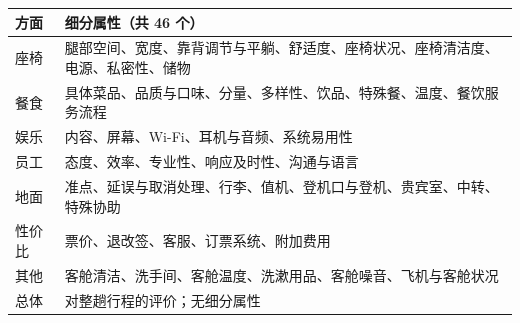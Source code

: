 \documentclass[10pt,twocolumn,a4paper]{article}
\begin{document}
\begin{center}\small
\begin{tabularx}{\textwidth}{@{}P{30mm}Y@{}}
\toprule
\textbf{方面} & \textbf{细分属性（共 46 个）} \\
\midrule
座椅 & 腿部空间、宽度、靠背调节与平躺、舒适度、座椅状况、座椅清洁度、电源、私密性、储物 \\
餐食 & 具体菜品、品质与口味、分量、多样性、饮品、特殊餐、温度、餐饮服务流程 \\
娱乐 & 内容、屏幕、Wi-Fi、耳机与音频、系统易用性 \\
员工 & 态度、效率、专业性、响应及时性、沟通与语言 \\
地面 & 准点、延误与取消处理、行李、值机、登机口与登机、贵宾室、中转、特殊协助 \\
性价比 & 票价、退改签、客服、订票系统、附加费用 \\
其他 & 客舱清洁、洗手间、客舱温度、洗漱用品、客舱噪音、飞机与客舱状况 \\
总体 & 对整趟行程的评价；无细分属性 \\
\bottomrule
\end{tabularx}
\end{center}
\end{document}
